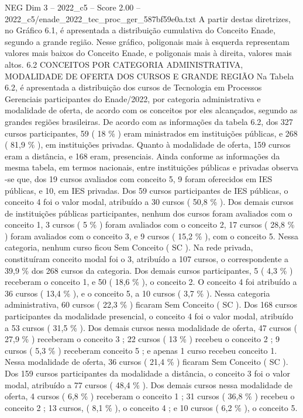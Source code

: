 \begin{textsample}{NEG Dim 3 – 2022\_c5 – Score 2.00 – 2022\_c5/enade\_2022\_tec\_proc\_ger\_587bf59e0a.txt}
A partir destas diretrizes, no Gráfico 6.1, é apresentada a distribuição cumulativa do Conceito Enade, segundo a grande região.
Nesse gráfico, poligonais mais à esquerda representam valores mais baixos do Conceito Enade, e poligonais mais à direita, valores mais altos. 6.2 CONCEITOS POR CATEGORIA ADMINISTRATIVA, MODALIDADE DE OFERTA DOS CURSOS E GRANDE REGIÃO Na Tabela 6.2, é apresentada a distribuição dos cursos de Tecnologia em Processos Gerenciais participantes do Enade/2022, por categoria administrativa e modalidade de oferta, de acordo com os conceitos por eles alcançados, segundo as grandes regiões brasileiras.
De acordo com as informações da tabela 6.2, dos 327 cursos participantes, 59 ( 18 \% ) eram ministrados em instituições públicas, e 268 ( 81,9 \% ), em instituições privadas.
Quanto à modalidade de oferta, 159 cursos eram a distância, e 168 eram, presenciais.
Ainda conforme as informações da mesma tabela, em termos nacionais, entre instituições públicas e privadas observa -se que, dos 19 cursos avaliados com conceito 5, 9 foram oferecidos em IES públicas, e 10, em IES privadas.
Dos 59 cursos participantes de IES públicas, o conceito 4 foi o valor modal, atribuído a 30 cursos ( 50,8 \% ).
Dos demais cursos de instituições públicas participantes, nenhum dos cursos foram avaliados com o conceito 1, 3 cursos ( 5 \% ) foram avaliados com o conceito 2, 17 cursos ( 28,8 \% ) foram avaliados com o conceito 3, e 9 cursos ( 15,2 \% ), com o conceito 5.
Nessa categoria, nenhum curso ficou Sem Conceito ( SC ).
Na rede privada, constituíram conceito modal foi o 3, atribuído a 107 cursos, o correspondente a 39,9 \% dos 268 cursos da categoria.
Dos demais cursos participantes, 5 ( 4,3 \% ) receberam o conceito 1, e 50 ( 18,6 \% ), o conceito 2.
O conceito 4 foi atribuído a 36 cursos ( 13,4 \% ), e o conceito 5, a 10 cursos ( 3,7 \% ).
Nessa categoria administrativa, 60 cursos ( 22,3 \% ) ficaram Sem Conceito ( SC ).
Dos 168 cursos participantes da modalidade presencial, o conceito 4 foi o valor modal, atribuído a 53 cursos ( 31,5 \% ).
Dos demais cursos nessa modalidade de oferta, 47 cursos ( 27,9 \% ) receberam o conceito 3 ; 22 cursos ( 13 \% ) recebeu o conceito 2 ; 9 cursos ( 5,3 \% ) receberam conceito 5 ; e apenas 1 curso recebeu conceito 1.
Nessa modalidade de oferta, 36 cursos ( 21,4 \% ) ficaram Sem Conceito ( SC ).
Dos 159 cursos participantes da modalidade a distância, o conceito 3 foi o valor modal, atribuído a 77 cursos ( 48,4 \% ).
Dos demais cursos nessa modalidade de oferta, 4 cursos ( 6,8 \% ) receberam o conceito 1 ; 31 cursos ( 36,8 \% ) recebeu o conceito 2 ; 13 cursos, ( 8,1 \% ), o conceito 4 ; e 10 cursos ( 6,2 \% ), o conceito 5.

\end{textsample}
